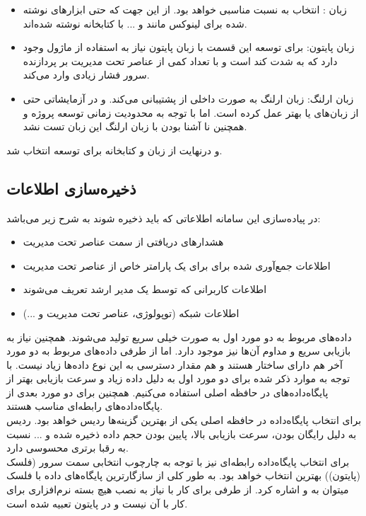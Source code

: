 \begin{itemize}
    \item زبان : انتخاب به نسبت مناسبی خواهد بود. از این جهت که حتی ابزارهای نوشته شده برای لینوکس مانند  و ... با کتابخانه  نوشته شده‌اند.
    \item زبان پایتون: برای توسعه این قسمت با زبان پایتون نیاز به استفاده از ماژول  وجود دارد که به شدت کند است و با تعداد کمی از عناصر تحت مدیریت بر پردازنده سرور فشار زیادی وارد می‌کند.
    \item زبان ارلنگ: زبان ارلنگ به صورت داخلی از  پشتیبانی می‌کند. و در آزمایشاتی حتی از زبان‌های  یا  بهتر عمل کرده است. اما با توجه به محدودیت زمانی توسعه پروژه و همچنین نا آشنا بودن با زبان ارلنگ این زبان تست نشد.
\end{itemize}

و درنهایت از زبان  و کتابخانه  برای توسعه انتخاب شد.


\subsection{ذخیره‌سازی اطلاعات}

در پیاده‌سازی این سامانه اطلاعاتی که باید ذخیره شوند به شرح زیر می‌باشد:
\begin{itemize}
    \item هشدارهای دریافتی از سمت عناصر تحت مدیریت
    \item اطلاعات جمع‌آوری شده برای برای یک پارامتر خاص از عناصر تحت مدیریت
    \item اطلاعات کاربرانی که توسط یک مدیر ارشد تعریف می‌شوند
    \item اطلاعات شبکه‌ (توپولوژی، عناصر تحت مدیریت و ...)

\end{itemize}

داده‌های مربوط به دو مورد اول به صورت خیلی سریع تولید می‌شوند. همچنین نیاز به بازیابی سریع و مداوم آن‌ها نیز موجود دارد. اما از طرفی داده‌های مربوط به دو مورد آخر هم دارای ساختار هستند و هم مقدار دسترسی به این نوع داده‌ها زیاد نیست. با توجه به موارد ذکر شده برای دو مورد اول به دلیل داده زیاد و سرعت بازیابی بهتر از پایگاه‌داده‌های در حافظه اصلی استفاده می‌کنیم. همچنین برای دو مورد بعدی از پایگاه‌داده‌های رابطه‌ای مناسب هستند.
\\
برای انتخاب پایگاه‌داده‌ در حافظه اصلی یکی از بهترین گزینه‌ها ردیس خواهد بود. ردیس به دلیل رایگان بودن، سرعت بازیابی بالا، پایین بودن حجم داده ذخیره شده و ... نسبت به رقبا برتری محسوسی دارد.
\\
برای انتخاب پایگاه‌داده رابطه‌ای نیز با توجه به چارچوب انتخابی سمت سرور (فلسک (پایتون))  بهترین انتخاب خواهد بود. به طور کلی از سازگارترین پایگاه‌های داده با فلسک میتوان به  و  اشاره کرد. از طرفی برای کار با  نیاز به نصب هیچ بسته نرم‌افزاری برای کار با آن نیست و در پایتون تعبیه شده است.



